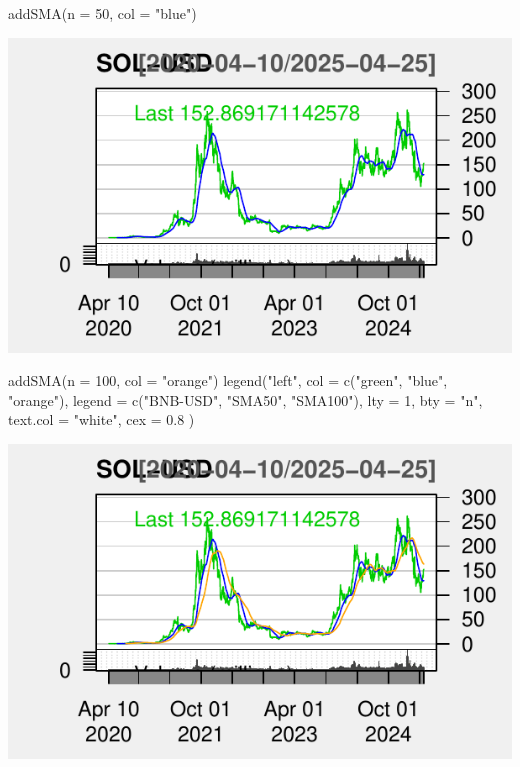 \documentclass[]{tufte-handout}
\newenvironment{Shaded}{}{}
\newcommand{\AttributeTok}[1]{\textcolor[rgb]{0.49,0.56,0.16}{#1}}
\newcommand{\DecValTok}[1]{\textcolor[rgb]{0.25,0.63,0.44}{#1}}
\newcommand{\FloatTok}[1]{\textcolor[rgb]{0.25,0.63,0.44}{#1}}
\newcommand{\FunctionTok}[1]{\textcolor[rgb]{0.02,0.16,0.49}{#1}}
\newcommand{\NormalTok}[1]{#1}
\newcommand{\StringTok}[1]{\textcolor[rgb]{0.25,0.44,0.63}{#1}}
\begin{document}
\begin{Shaded}
\begin{Highlighting}[]
\FunctionTok{addSMA}\NormalTok{(}\AttributeTok{n =} \DecValTok{50}\NormalTok{, }\AttributeTok{col =} \StringTok{"blue"}\NormalTok{)}
\end{Highlighting}
\end{Shaded}

\includegraphics{cripto_update_files/figure-latex/unnamed-chunk-10-2}

\begin{Shaded}
\begin{Highlighting}[]
\FunctionTok{addSMA}\NormalTok{(}\AttributeTok{n =} \DecValTok{100}\NormalTok{, }\AttributeTok{col =} \StringTok{"orange"}\NormalTok{)}
\FunctionTok{legend}\NormalTok{(}\StringTok{"left"}\NormalTok{,}
  \AttributeTok{col =} \FunctionTok{c}\NormalTok{(}\StringTok{"green"}\NormalTok{, }\StringTok{"blue"}\NormalTok{, }\StringTok{"orange"}\NormalTok{),}
  \AttributeTok{legend =} \FunctionTok{c}\NormalTok{(}\StringTok{"BNB{-}USD"}\NormalTok{, }\StringTok{"SMA50"}\NormalTok{, }\StringTok{"SMA100"}\NormalTok{), }\AttributeTok{lty =} \DecValTok{1}\NormalTok{, }\AttributeTok{bty =} \StringTok{"n"}\NormalTok{,}
  \AttributeTok{text.col =} \StringTok{"white"}\NormalTok{, }\AttributeTok{cex =} \FloatTok{0.8}
\NormalTok{)}
\end{Highlighting}
\end{Shaded}

\includegraphics{cripto_update_files/figure-latex/unnamed-chunk-10-3}
\end{document}

